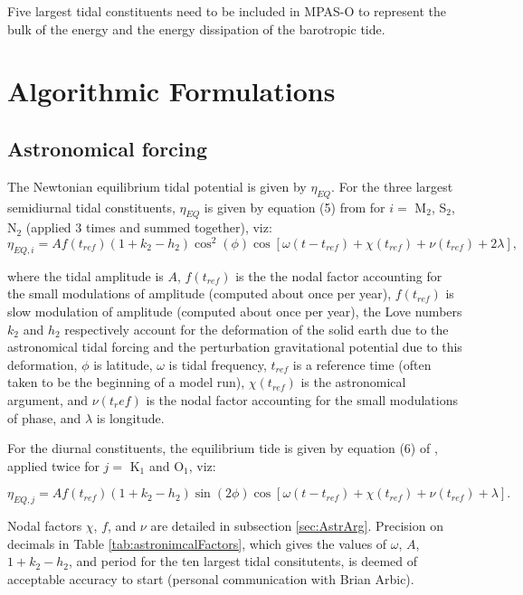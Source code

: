 Five largest tidal constituents need to be included in MPAS-O to represent the bulk of the energy and the energy dissipation of the barotropic tide.



\chapter{Algorithmic Formulations}

\section{Astronomical forcing}

The Newtonian equilibrium tidal potential is given by $\eta_{EQ}$.  For the three largest semidiurnal tidal constituents, $\eta_{EQ}$ is given by equation (5) from \citet{chassignet_primer_2018} for $i=$ M$_{2}$, S$_{2}$, N$_{2}$ (applied 3 times and summed together), viz:
\begin{equation}
\eta_{EQ,i} = Af(t_{ref})(1+k_2-h_2)\cos^2(\phi)\cos\left[\omega(t-t_{ref}) + \chi(t_{ref}) + \nu(t_{ref}) + 2\lambda\right],
\label{eq:Eq5}
\end{equation}

where the tidal amplitude is $A$, $f(t_{ref})$ is the the nodal factor accounting for the small modulations of amplitude (computed about once per year), $f(t_{ref})$ is slow modulation of amplitude (computed about once per year), the Love numbers $k_2$ and $h_2$ respectively account for the deformation of the solid earth due to the astronomical tidal forcing and the perturbation gravitational potential due to this deformation, $\phi$ is latitude, $\omega$ is tidal frequency, $t_{ref}$ is a reference time (often taken to be the beginning of a model run), $\chi(t_{ref})$ is the astronomical argument, and $\nu(t_ref)$ is the nodal factor accounting for the small modulations of phase, and $\lambda$ is longitude.

For the diurnal constituents, the equilibrium tide is given by equation (6) of \citet{chassignet_primer_2018}, applied twice for $j=$ K$_{1}$ and O$_{1}$, viz:

\begin{equation}
\eta_{EQ,j} = A f(t_{ref}) (1+k_2-h_2)\sin(2\phi)\cos\left[\omega(t-t_{ref}) + \chi(t_{ref}) + \nu(t_{ref}) + \lambda \right].
\label{eq:Eq6}
\end{equation}

Nodal factors 
$\chi$, $f$, and $\nu$ are detailed in subsection \ref{sec:AstrArg}.
Precision on decimals in Table \ref{tab:astronimcalFactors}, which gives the values of $\omega$, $A$, $1+k_2-h_2$, and period for the ten largest tidal consitutents, is deemed of acceptable accuracy to start (personal communication with Brian Arbic).

